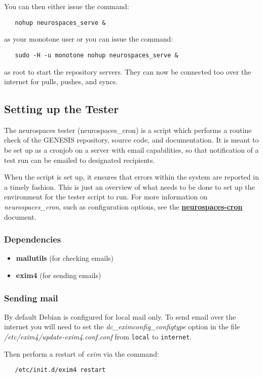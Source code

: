 \documentclass[12pt]{article}
\begin{document}
You can then either issue the command:
\begin{verbatim}
   nohup neurospaces_serve &
\end{verbatim}
as your monotone user or you can issue the command:
\begin{verbatim}
   sudo -H -u monotone nohup neurospaces_serve &
\end{verbatim}
as root to start the repository servers. They can now be connected too over the internet for pulls, pushes, and syncs.

\subsection*{Setting up the Tester}

The neurospaces tester (neurospaces\_cron) is a script which performs a routine check of the GENESIS repository, source code, and documentation. It is meant to be set up as a cronjob on a server with email capabilities, so that notification of a test run can be emailed to designated recipients.

When the script is set up, it ensures that errors within the system are reported in a timely fashion. This is just an overview of what needs to be done to set up the environment for the tester script to run. For more information on {\it neurospaces\_cron}, such as configuration options, see the \href{../neurospaces-cron/neurospaces-cron.tex}{\bf neurospaces-cron} document. 

\subsubsection*{Dependencies}
\begin{itemize}
\item[]{\bf mailutils} (for checking emails)
\item[]{\bf exim4} (for sending emails)
\end{itemize}

\subsubsection*{Sending mail}

By default Debian is configured for local mail only. To send email over the internet you will need to set the {\it dc\_eximconfig\_configtype} option in the file {\it /etc/exim4/update-exim4.conf.conf} from {\tt local} to {\tt internet}.

Then perform a restart of {\it exim} via the command:
\begin{verbatim}
   /etc/init.d/exim4 restart
\end{verbatim}
\end{document}
